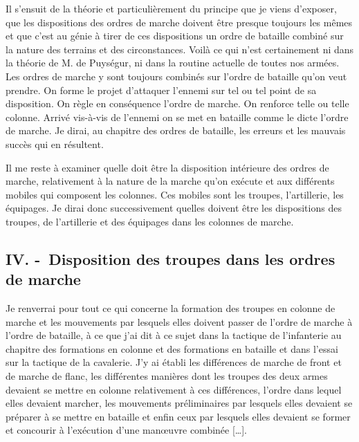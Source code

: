 \documentclass[french,twoside]{book} %
\begin{document}
Il s’ensuit de la théorie et particulièrement du principe que je viens d’exposer, que les dispositions des ordres de marche doivent être presque toujours les mêmes et que c’est au génie à tirer de ces dispositions un ordre de bataille combiné sur la nature des terrains et des circonstances. Voilà ce qui n’est certainement ni dans la théorie de M. de Puységur, ni dans la routine actuelle de toutes nos armées. Les ordres de marche y sont toujours combinés sur l’ordre de bataille qu’on veut prendre. On forme le projet d’attaquer l’ennemi sur tel ou tel point de sa disposition. On règle en conséquence l’ordre de marche. On renforce telle ou telle colonne. Arrivé vis-à-vis de l’ennemi on se met en bataille comme le dicte l’ordre de marche. Je dirai, au chapitre des ordres de bataille, les erreurs et les mauvais succès qui en résultent.\par
Il me reste à examiner quelle doit être la disposition intérieure des ordres de marche, relativement à la nature de la marche qu’on exécute et aux différents mobiles qui composent les colonnes. Ces mobiles sont les troupes, l’artillerie, les équipages. Je dirai donc successivement quelles doivent être les dispositions des troupes, de l’artillerie et des équipages dans les colonnes de marche.
\subsection[{IV. - Disposition des troupes dans les ordres de marche}]{IV. - Disposition des troupes dans les ordres de marche}
\noindent Je renverrai pour tout ce qui concerne la formation des troupes en colonne de marche et les mouvements par lesquels elles doivent passer de l’ordre de marche à l’ordre de bataille, à ce que j’ai dit à ce sujet dans la tactique de l’infanterie au chapitre des formations en colonne et des formations en bataille et dans l’essai sur la tactique de la cavalerie. J’y ai établi les différences de marche de front et de marche de flanc, les différentes manières dont les troupes des deux armes devaient se mettre en colonne relativement à ces différences, l’ordre dans lequel elles devaient marcher, les mouvements préliminaires par lesquels elles devaient se préparer à se mettre en bataille et enfin ceux par lesquels elles devaient se former et concourir à l’exécution d’une manœuvre combinée […].
\end{document}
